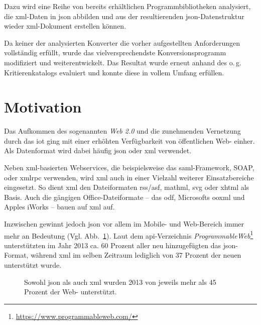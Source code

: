 Dazu wird eine Reihe von bereits erhältlichen Programmbibliotheken analysiert,
die \acrshort{xml}-Daten in \acrshort{json} abbilden und aus der resultierenden
\acrshort{json}-Datenstruktur wieder \acrshort{xml}-Dokument erstellen können.


Da keiner der analysierten Konverter die vorher aufgestellten Anforderungen
vollständig erfüllt, wurde das vielversprechendste Konversionsprogramm
modifiziert und weiterentwickelt. Das Resultat wurde erneut anhand des o.\,g.
Kritierenkatalogs evaluiert und konnte diese in vollem Umfang erfüllen.

\section{Motivation}
\label{sec:motivation}
Das Aufkommen des sogenannten \emph{Web 2.0} und die zunehmenden Vernetzung
durch das \gls{iot} ging mit einer erhöhten
Verfügbarkeit von öffentlichen Web- einher. Als Datenformat wird dabei
häufig \acrshort{json} oder \acrshort{xml} verwendet.

Neben \acrshort{xml}-basierten Webservices, die beispielsweise das \acrshort{saml}-Framework, SOAP,
oder \gls{xmlrpc} verwenden, wird \acrshort{xml} auch in einer Vielzahl weiterer
Einsatzbereiche eingesetzt. So dient \acrshort{xml} den Dateiformaten \acrshort{rss}/\acrshort{asf}, \acrshort{mathml},
\gls{svg} oder \gls{xhtml} als Basis. Auch die gängigen
Office-Dateiformate -- das \acrfull{odf}, Microsofts %
\acrfull{ooxml} und Apples iWorks -- bauen auf \acrshort{xml} auf. %

Inzwischen gewinnt jedoch \acrshort{json} vor allem im Mobile-
und Web-Bereich immer mehr an Bedeutung (Vgl. Abb.~\ref{fig:xmljsonapis}). Laut dem \acrshort{api}-Verzeichnis
\emph{ProgrammableWeb}\footnote{\url{https://www.programmableweb.com/}} unterstützten im Jahr 2013 ca. 60 Prozent aller neu
hinzugefügten  das \acrshort{json}-Format, während
\acrshort{xml} im selben Zeitraum lediglich von 37 Prozent der neuen 
unterstützt wurde.~\cite{duvander2013convergence}

\begin{figure}[h!]
    \begin{center}
        
    \end{center}
    \caption{Sowohl \acrshort{json} als auch \acrshort{xml} wurden 2013 von jeweils mehr als 45 Prozent der Web- unterstützt.}
    \label{fig:xmljsonapis}
\end{figure}


